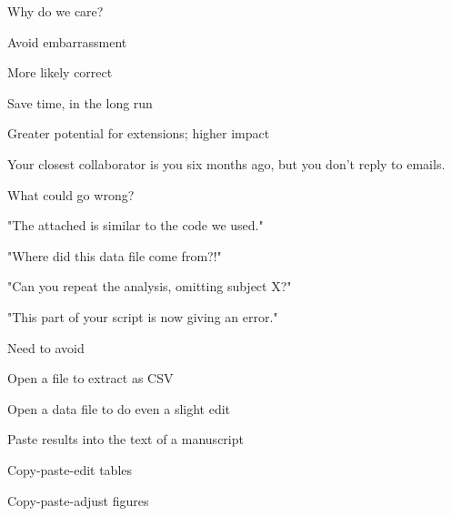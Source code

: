 \documentclass[12pt,t]{beamer}
\begin{document}
\begin{frame}{Why do we care?}

\vspace{24pt}

\bi
\itemsep12pt
\item Avoid embarrassment
\item More likely correct
\item Save time, in the long run
\item Greater potential for extensions; higher impact
\ei

\end{frame}


\begin{frame}[c]{}

\centering
\large
Your closest collaborator is you six months ago, but you
don't reply to emails.
\end{frame}


\begin{frame}{What could go wrong?}

\vspace{24pt}

\bi
\itemsep12pt
\item "The attached is similar to the code we used."
\item "Where did this data file come from?!"
\item "Can you repeat the analysis, omitting subject X?"
\item "This part of your script is now giving an error."
\ei

\end{frame}


\begin{frame}{Need to avoid}


\vspace{24pt}

\bi
\itemsep12pt
\item Open a file to extract as CSV
\item Open a data file to do even a slight edit
\item Paste results into the text of a manuscript
\item Copy-paste-edit tables
\item Copy-paste-adjust figures
\ei

\end{frame}
\end{document}
